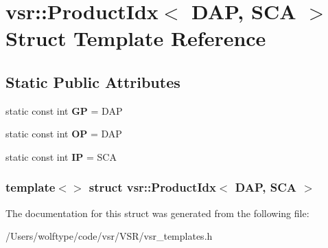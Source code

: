 \hypertarget{structvsr_1_1_product_idx_3_01_d_a_p_00_01_s_c_a_01_4}{\section{vsr\-:\-:Product\-Idx$<$ D\-A\-P, S\-C\-A $>$ Struct Template Reference}
\label{structvsr_1_1_product_idx_3_01_d_a_p_00_01_s_c_a_01_4}
}
\subsection*{Static Public Attributes}
\begin{DoxyCompactItemize}
\item 
\hypertarget{structvsr_1_1_product_idx_3_01_d_a_p_00_01_s_c_a_01_4_af2d4951a9eab96c2f39210dd84b7c86a}{static const int {\bfseries G\-P} = D\-A\-P}\label{structvsr_1_1_product_idx_3_01_d_a_p_00_01_s_c_a_01_4_af2d4951a9eab96c2f39210dd84b7c86a}

\item 
\hypertarget{structvsr_1_1_product_idx_3_01_d_a_p_00_01_s_c_a_01_4_a338cea609ecdab0c7f4ebd3c1fae5d4d}{static const int {\bfseries O\-P} = D\-A\-P}\label{structvsr_1_1_product_idx_3_01_d_a_p_00_01_s_c_a_01_4_a338cea609ecdab0c7f4ebd3c1fae5d4d}

\item 
\hypertarget{structvsr_1_1_product_idx_3_01_d_a_p_00_01_s_c_a_01_4_a0d08513fe4bc11e52d2f969474a3ef35}{static const int {\bfseries I\-P} = S\-C\-A}\label{structvsr_1_1_product_idx_3_01_d_a_p_00_01_s_c_a_01_4_a0d08513fe4bc11e52d2f969474a3ef35}

\end{DoxyCompactItemize}
\subsubsection*{template$<$$>$ struct vsr\-::\-Product\-Idx$<$ D\-A\-P, S\-C\-A $>$}



The documentation for this struct was generated from the following file\-:\begin{DoxyCompactItemize}
\item 
/\-Users/wolftype/code/vsr/\-V\-S\-R/vsr\-\_\-templates.\-h\end{DoxyCompactItemize}
